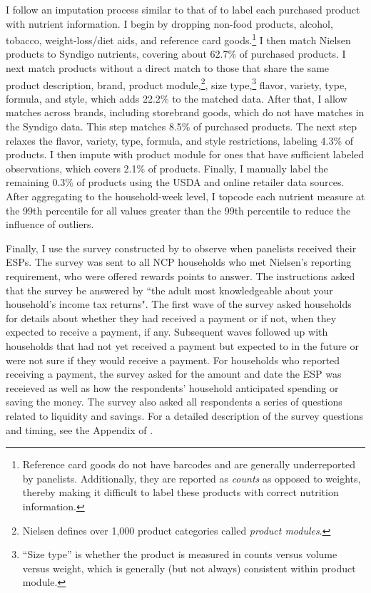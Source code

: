 \documentclass[12pt]{article}
\begin{document}
I follow an imputation process similar to that of \textcite{dubois2014prices} to label each purchased product with nutrient information.
I begin by dropping non-food products, alcohol, tobacco, weight-loss/diet aids, and reference card goods.\footnote{Reference card goods do not have barcodes and are generally underreported by panelists.
Additionally, they are reported as \textit{counts} as opposed to weights, thereby making it difficult to label these products with correct nutrition information.} %
I then match Nielsen products to Syndigo nutrients, covering about 62.7\% of purchased products.
I next match products without a direct match to those that share the same product description, brand, product module,\footnote{Nielsen defines over 1,000 product categories called \textit{product modules}.}, size type,\footnote{``Size type'' is whether the product is measured in counts versus volume versus weight, which is generally (but not always) consistent within product module.} flavor, variety, type, formula, and style, which adds 22.2\% to the matched data.
After that, I allow matches across brands, including storebrand goods, which do not have matches in the Syndigo data.
This step matches 8.5\% of purchased products.
The next step relaxes the flavor, variety, type, formula, and style restrictions, labeling 4.3\% of products.
I then impute with product module for ones that have sufficient labeled observations, which covers 2.1\% of products.
Finally, I manually label the remaining 0.3\% of products using the USDA and online retailer data sources.
After aggregating to the household-week level, I topcode each nutrient measure at the 99th percentile for all values greater than the 99th percentile to reduce the influence of outliers.

Finally, I use the survey constructed by \textcite{broda2014economic} to observe when panelists received their ESPs.
The survey was sent to all NCP households who met Nielsen's reporting requirement, who were offered rewards points to answer.
The instructions asked that the survey be answered by ``the adult most knowledgeable about your household's income tax returns".
The first wave of the survey asked households for details about whether they had received a payment or if not, when they expected to receive a payment, if any.
Subsequent waves followed up with households that had not yet received a payment but expected to in the future or were not sure if they would receive a payment.
For households who reported receiving a payment, the survey asked for the amount and date the ESP was receieved as well as how the respondents' household anticipated spending or saving the money.
The survey also asked all respondents a series of questions related to liquidity and savings.
For a detailed description of the survey questions and timing, see the Appendix of \textcite{broda2014economic}.
\end{document}

